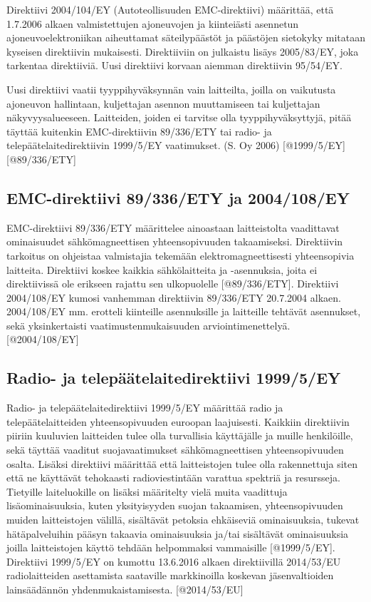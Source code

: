 \documentclass[]{article}
\begin{document}
Direktiivi 2004/104/EY (Autoteollisuuden EMC-direktiivi) määrittää, että
1.7.2006 alkaen valmistettujen ajoneuvojen ja kiinteiästi asennetun
ajoneuvoelektroniikan aiheuttamat säteilypäästöt ja päästöjen sietokyky
mitataan kyseisen direktiivin mukaisesti. Direktiiviin on julkaistu
lisäys 2005/83/EY, joka tarkentaa direktiiviä. Uusi direktiivi korvaan
aiemman direktiivin 95/54/EY.

Uusi direktiivi vaatii tyyppihyväksynnän vain laitteilta, joilla on
vaikutusta ajoneuvon hallintaan, kuljettajan asennon muuttamiseen tai
kuljettajan näkyvyysalueeseen. Laitteiden, joiden ei tarvitse olla
tyyppihyväksyttyjä, pitää täyttää kuitenkin EMC-direktiivin 89/336/ETY
tai radio- ja telepäätelaitedirektiivin 1999/5/EY vaatimukset. (S. Oy
2006) {[}@1999/5/EY{]} {[}@89/336/ETY{]}

\subsection{EMC-direktiivi 89/336/ETY ja
2004/108/EY}\label{emc-direktiivi-89336ety-ja-2004108ey}

EMC-direktiivi 89/336/ETY määrittelee ainoastaan laitteistolta
vaadittavat ominaisuudet sähkömagneettisen yhteensopivuuden
takaamiseksi. Direktiivin tarkoitus on ohjeistaa valmistajia tekemään
elektromagneettisesti yhteensopivia laitteita. Direktiivi koskee kaikkia
sähkölaitteita ja -asennuksia, joita ei direktiivissä ole erikseen
rajattu sen ulkopuolelle {[}@89/336/ETY{]}. Direktiivi 2004/108/EY
kumosi vanhemman direktiivin 89/336/ETY 20.7.2004 alkaen. 2004/108/EY
mm. erotteli kiinteille asennuksille ja laitteille tehtävät asennukset,
sekä yksinkertaisti vaatimustenmukaisuuden arviointimenettelyä.
{[}@2004/108/EY{]}

\subsection{Radio- ja telepäätelaitedirektiivi
1999/5/EY}\label{radio--ja-telepuxe4uxe4telaitedirektiivi-19995ey}

Radio- ja telepäätelaitedirektiivi 1999/5/EY määrittää radio ja
telepäätelaitteiden yhteensopivuuden euroopan laajuisesti. Kaikkiin
direktiivin piiriin kuuluvien laitteiden tulee olla turvallisia
käyttäjälle ja muille henkilöille, sekä täyttää vaaditut
suojavaatimukset sähkömagneettisen yhteensopivuuden osalta. Lisäksi
direktiivi määrittää että laitteistojen tulee olla rakennettuja siten
että ne käyttävät tehokaasti radioviestintään varattua spektriä ja
resursseja. Tietyille laiteluokille on lisäksi määritelty vielä muita
vaadittuja lisäominaisuuksia, kuten yksityisyyden suojan takaamisen,
yhteensopivuuden muiden laitteistojen välillä, sisältävät petoksia
ehkäiseviä ominaisuuksia, tukevat hätäpalveluihin pääsyn takaavia
ominaisuuksia ja/tai sisältävät ominaisuuksia joilla laitteistojen
käyttö tehdään helpommaksi vammaisille {[}@1999/5/EY{]}. Direktiivi
1999/5/EY on kumottu 13.6.2016 alkaen direktiivillä 2014/53/EU
radiolaitteiden asettamista saataville markkinoilla koskevan
jäsenvaltioiden lainsäädännön yhdenmukaistamisesta. {[}@2014/53/EU{]}
\end{document}
